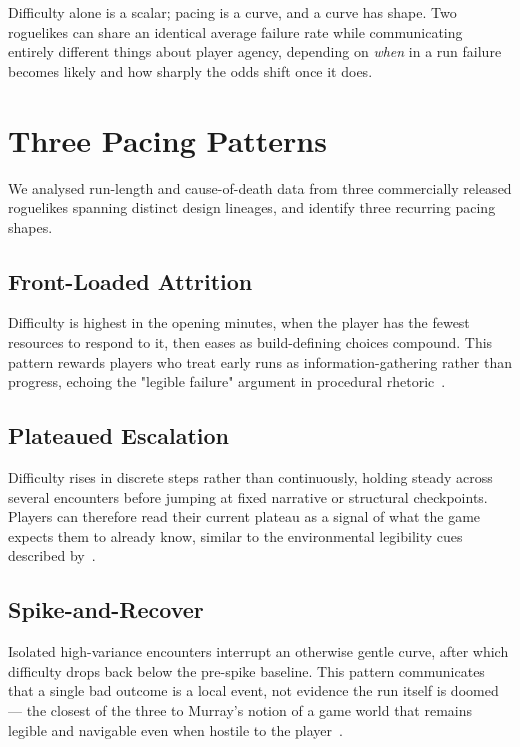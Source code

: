 \documentclass[blue,fullpaper]{ludusofficial}
\begin{document}
Difficulty alone is a scalar; pacing is a curve, and a curve has shape.
Two roguelikes can share an identical average failure rate while
communicating entirely different things about player agency, depending on
\emph{when} in a run failure becomes likely and how sharply the odds shift
once it does.

\section{Three Pacing Patterns}

We analysed run-length and cause-of-death data from three commercially
released roguelikes spanning distinct design lineages, and identify three
recurring pacing shapes.

\subsection{Front-Loaded Attrition}

Difficulty is highest in the opening minutes, when the player has the
fewest resources to respond to it, then eases as build-defining choices
compound. This pattern rewards players who treat early runs as
information-gathering rather than progress, echoing the "legible failure"
argument in procedural rhetoric~\cite{bogost2007}.

\subsection{Plateaued Escalation}

Difficulty rises in discrete steps rather than continuously, holding steady
across several encounters before jumping at fixed narrative or structural
checkpoints. Players can therefore read their current plateau as a signal
of what the game expects them to already know, similar to the
environmental legibility cues described by~\cite{jenkins2004}.

\subsection{Spike-and-Recover}

Isolated high-variance encounters interrupt an otherwise gentle curve,
after which difficulty drops back below the pre-spike baseline. This
pattern communicates that a single bad outcome is a local event, not
evidence the run itself is doomed — the closest of the three to Murray's
notion of a game world that remains legible and navigable even when hostile
to the player~\cite{murray1997}.
\end{document}
